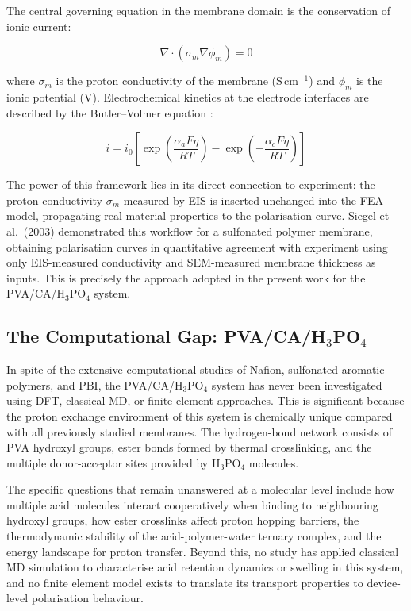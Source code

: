 \documentclass[12pt,a4paper]{report}
\begin{document}
The central governing equation in the membrane domain is the 
conservation of ionic current:

\begin{equation}
\nabla \cdot \left( \sigma_{m} \nabla \phi_{m} \right) = 0
\end{equation}

where \(\sigma_{m}\) is the proton conductivity of the membrane 
(S\,cm\(^{-1}\)) and \(\phi_{m}\) is the ionic potential (V). 
Electrochemical kinetics at the electrode interfaces are described 
by the Butler--Volmer equation \cite{66}:

\begin{equation}
i = i_0 \left[ 
\exp\!\left(\frac{\alpha_a F \eta}{RT}\right) - 
\exp\!\left(-\frac{\alpha_c F \eta}{RT}\right) 
\right]
\end{equation}

The power of this framework lies in its direct connection to 
experiment: the proton conductivity \(\sigma_{m}\) measured by EIS 
is inserted unchanged into the FEA model, propagating real material 
properties to the polarisation curve. Siegel et al.\ (2003) 
demonstrated this workflow for a sulfonated polymer membrane, 
obtaining polarisation curves in quantitative agreement with 
experiment using only EIS-measured conductivity and SEM-measured 
membrane thickness as inputs. This is precisely the approach adopted 
in the present work for the PVA/CA/H\(_3\)PO\(_4\) system.

\subsection{The Computational Gap: PVA/CA/H\(_3\)PO\(_4\)}

In spite of the extensive computational studies of Nafion, 
sulfonated aromatic polymers, and PBI, the 
PVA/CA/H\(_3\)PO\(_4\) system has never been investigated 
using DFT, classical MD, or finite element approaches. This 
is significant because the proton exchange environment of 
this system is chemically unique compared with all previously 
studied membranes. The hydrogen-bond network consists of 
PVA hydroxyl groups, ester bonds formed by thermal 
crosslinking, and the multiple donor-acceptor sites provided 
by H\(_3\)PO\(_4\) molecules.\cite{20,59}

The specific questions that remain unanswered at a molecular 
level include how multiple acid molecules interact 
cooperatively when binding to neighbouring hydroxyl groups, 
how ester crosslinks affect proton hopping barriers, the 
thermodynamic stability of the acid-polymer-water ternary 
complex, and the energy landscape for proton transfer. 
Beyond this, no study has applied classical MD simulation 
to characterise acid retention dynamics or swelling in this 
system, and no finite element model exists to translate its 
transport properties to device-level polarisation 
behaviour.\cite{53,54}
\end{document}
